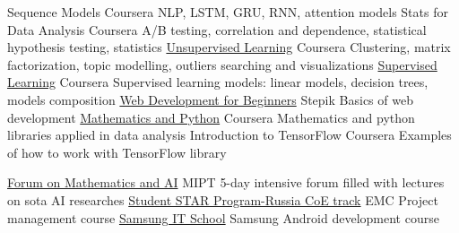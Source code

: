 \documentclass[
	a4paper,
]{fortysecondscv}
\begin{document}
\newpage
\makebacksidebar


\begin{cvtable}[1.5]
        {Sequence Models}
        {Coursera}
        {NLP, LSTM, GRU, RNN, attention models}
        {Stats for Data Analysis}
        {Coursera}
        {A/B testing, correlation and dependence, statistical hypothesis testing, statistics}
        {\href{https://www.coursera.org/account/accomplishments/certificate/BADWME4J7J8E}
        {Unsupervised Learning}}
        {Coursera}
        {Clustering, matrix factorization, topic modelling, outliers 
         searching and visualizations}
        {\href{https://coursera.org/share/f90c8676dcf8c9e33dfe0443387988ef}
        {Supervised Learning}}
        {Coursera}
        {Supervised learning models: linear models, decision trees, models composition}
        {\href{https://stepik.org/cert/321173}
        {Web Development for Beginners}}
        {Stepik}
        {Basics of web development}
        {\href{https://coursera.org/share/faf5859452fbdda8a36084effc34793a}
        {Mathematics and Python}}
        {Coursera}
        {Mathematics and python libraries applied in data analysis}
        {Introduction to TensorFlow}
        {Coursera}
        {Examples of how to work with TensorFlow library}
\end{cvtable}

\begin{cvtable}[1.5]
        {\href{https://vk.com/math_ai}
        {Forum on Mathematics and AI}}
        {MIPT}
        {5-day intensive forum filled with lectures on sota AI researches}
        {\href{https://education.dellemc.com/content/emc/en-us/student-star.html}
        {Student STAR Program-Russia CoE track}}
        {EMC}
        {Project management course}
        {\href{https://myitschool.ru/}
        {Samsung IT School}}
        {Samsung}
        {Android development course}
\end{cvtable}
\end{document}
